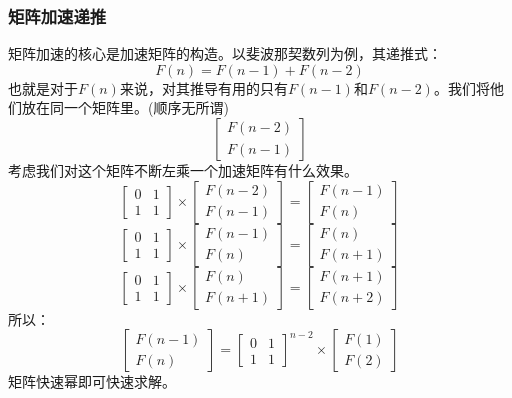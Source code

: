 \documentclass[a4paper]{book}
\begin{document}
\subsubsection{矩阵加速递推}
矩阵加速的核心是加速矩阵的构造。以斐波那契数列为例，其递推式：\\
$$
F(n)=F(n-1)+F(n-2)
$$
也就是对于$F(n)$来说，对其推导有用的只有$F(n-1)$和$F(n-2)$。我们将他们放在同一个矩阵里。(顺序无所谓)\\
$$
\begin{bmatrix}
    F(n-2)\\F(n-1)
\end{bmatrix} 
$$
考虑我们对这个矩阵不断左乘一个加速矩阵有什么效果。
$$
\begin{bmatrix}
    0 & 1\\1 & 1
\end{bmatrix} \times
\begin{bmatrix}
    F(n-2)\\F(n-1)
\end{bmatrix} =
\begin{bmatrix}
    F(n-1)\\F(n)
\end{bmatrix} 
$$
$$
\begin{bmatrix}
    0 & 1\\1 & 1
\end{bmatrix} \times
\begin{bmatrix}
    F(n-1)\\F(n)
\end{bmatrix} =
\begin{bmatrix}
    F(n)\\F(n+1)
\end{bmatrix} 
$$
$$
\begin{bmatrix}
    0 & 1\\1 & 1
\end{bmatrix} \times
\begin{bmatrix}
    F(n)\\F(n+1)
\end{bmatrix} =
\begin{bmatrix}
    F(n+1)\\F(n+2)
\end{bmatrix}
$$
所以：\\
$$
\begin{bmatrix}
    F(n-1)\\F(n)
\end{bmatrix} =
\begin{bmatrix}
    0 & 1\\1 & 1
\end{bmatrix}^{n-2} \times
\begin{bmatrix}
    F(1)\\F(2)
\end{bmatrix}
$$
矩阵快速幂即可快速求解。
\end{document}
